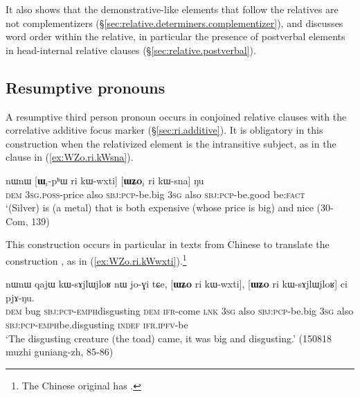 It also shows that the demonstrative-like elements  that follow the relatives 
are not complementizers (§\ref{sec:relative.determiners.complementizer}), and discusses word order within the relative, in particular the presence of postverbal elements in head-internal relative clauses (§\ref{sec:relative.postverbal}).

\subsection{Resumptive pronouns} \label{sec:resumptive}
A resumptive third person pronoun  occurs in conjoined relative clauses with the correlative additive focus marker  (§\ref{sec:ri.additive}). It is obligatory in this construction when the relativized element is the intransitive subject, as in the clause  in (\ref{ex:WZo.ri.kWsna}).

\begin{exe}
\ex \label{ex:WZo.ri.kWsna}
\gll nɯnɯ [\textbf{ɯ}$_i$-pʰɯ ri kɯ-wxti] [\textbf{ɯʑo}$_i$ ri kɯ-sna] ŋu \\
\textsc{dem} \textsc{3sg}.\textsc{poss}-price also \textsc{sbj}:\textsc{pcp}-be.big \textsc{3sg} also \textsc{sbj}:\textsc{pcp}-be.good be:\textsc{fact} \\
\glt `(Silver) is (a metal) that is both expensive (whose price is big) and nice (30-Com, 139)
\end{exe}

This construction occurs in particular in texts from Chinese to translate the construction , as in (\ref{ex:WZo.ri.kWwxti}).\footnote{The Chinese original has .}

\begin{exe}
\ex \label{ex:WZo.ri.kWwxti}
\gll nɯnɯ qajɯ kɯ-sɤjlɯ\redp{}jloʁ nɯ jo-ɣi tɕe,  [\textbf{ɯʑo} ri kɯ-wxti], [\textbf{ɯʑo} ri kɯ-sɤjlɯ\redp{}jloʁ] ci pjɤ-ŋu. \\
\textsc{dem} bug \textsc{sbj}:\textsc{pcp}-\textsc{emph}\redp{}disgusting \textsc{dem} \textsc{ifr}-come \textsc{lnk} 
\textsc{3sg} also \textsc{sbj}:\textsc{pcp}-be.big \textsc{3sg} also \textsc{sbj}:\textsc{pcp}-\textsc{emph}\redp{}be.disgusting \textsc{indef} \textsc{ifr}.\textsc{ipfv}-be \\
\glt `The disgusting creature (the toad) came, it was big and disgusting.' (150818 muzhi guniang-zh, 85-86)
\end{exe}
 
